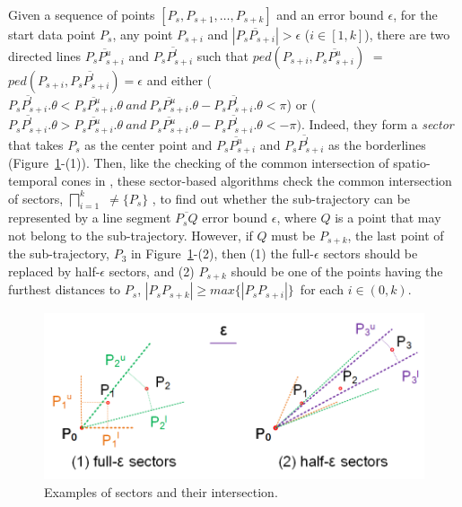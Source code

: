 Given a sequence of points $[P_{s}, P_{s+1}, \ldots, P_{s+k}]$ and an error bound $\epsilon$,
for the start data point $P_s$, any point $P_{s+i}$ and $|\overline{P_sP_{s+i}}|>\epsilon$ ($i\in[1, k]$), there are two directed lines $\overline{P_sP^u_{s+i}}$ and $\overline{P_sP^l_{s+i}}$ such that $ped(P_{s+i}, \overline{P_sP^u_{s+i}})$ $=$ $ped(P_{s+i}, \overline{P_sP^l_{s+i}}) = \epsilon$ and either ($\overline{P_sP^l_{s+i}}.\theta < \overline{P_sP^u_{s+i}}.\theta ~and~\overline{P_sP^u_{s+i}}.\theta - \overline{P_sP^l_{s+i}}.\theta <\pi$) or ($\overline{P_sP^l_{s+i}}.\theta > \overline{P_sP^u_{s+i}}.\theta ~and~ \overline{P_sP^u_{s+i}}.\theta - \overline{P_sP^l_{s+i}}.\theta < -\pi)$. Indeed, they form a \emph{sector}  that takes $P_s$ as the center point and $\overline{P_sP^u_{s+i}}$ and $\overline{P_sP^l_{s+i}}$ as the borderlines (Figure~\ref{fig:sleeve}-(1)).
%
Then, like the checking of the common intersection of spatio-temporal cones in \cised, these sector-based algorithms check the common intersection of sectors, \ie $\bigsqcap_{i=1}^{k}$ $\ne \{P_s\}$ \cite{Williams:Longest, Sklansky:Cone,Zhao:Sleeve}, to find out whether the sub-trajectory can be represented by a line segment $\overline{P_sQ}$ \wrt error bound $\epsilon$, where $Q$ is a point that may not belong to the sub-trajectory. However, if $Q$ must be $P_{s+k}$, the last point of the sub-trajectory, \eg $P_3$ in Figure~\ref{fig:sleeve}-(2), then (1) the full-$\epsilon$ sectors should be replaced by half-$\epsilon$ sectors, and (2) $P_{s+k}$ should be one of the points having the furthest distances to $P_s$, \ie $|P_sP_{s+k}| \ge max\{|P_sP_{s+i}|\}$~for each $i \in (0, k)$. 
%

\begin{figure}[tb!]
	\centering
	\includegraphics[scale=1.0]{figures/Fig-Sleeve.png}
	\vspace{-2ex}
	\caption{\small Examples of sectors and their intersection.}
	\vspace{-2ex}
	\label{fig:sleeve}
\end{figure}


